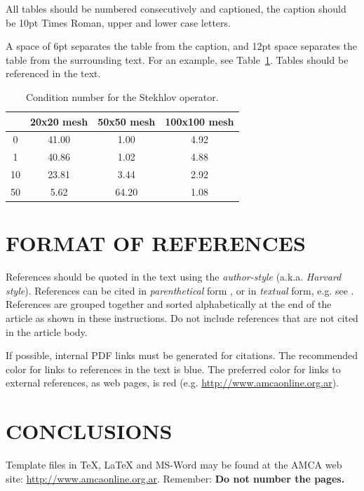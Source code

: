 \documentclass[oneside,a4paper,english,links]{amca}
\begin{document}
All tables should be numbered consecutively and captioned, the caption
should be 10pt Times Roman, upper and lower case letters.

A space of 6pt separates the table from the caption, and 12pt space
separates the table from the surrounding text. For an example, see
Table~\ref{tab:n50}. Tables should be referenced in the text.

\begin{table}[htb]
\centering
\begin{tabular}{|c|c|c|c|}
\hline  & 20x20 mesh & 50x50 mesh & 100x100 mesh\\
\hline
\hline
 0 & 41.00 & 1.00 & 4.92\\
\hline
 1 & 40.86 & 1.02 & 4.88 \\
\hline
10 & 23.81 & 3.44 & 2.92 \\
\hline
50 & 5.62 & 64.20 & 1.08 \\
\hline
\end{tabular}
\caption{Condition number for the Stekhlov operator. }
\label{tab:n50}
\end{table}

\section{FORMAT OF REFERENCES}

References should be quoted in the text using the \emph{author-style}
(a.k.a. \emph{Harvard style}). References can be cited in
\emph{parenthetical} form \citep{zienkiewicz91,idelsohn94,meyer82,meyer82b}, or
in \emph{textual} form, e.g. see
\citet{zienkiewicz91,idelsohn94,meyer82,meyer82b}.  References are grouped
together and sorted alphabetically at the end of the article as shown
in these instructions. Do not include references that are not cited in
the article body. 

If possible, internal PDF links must be generated for citations. The
recommended color for links to references in the text is blue. The
preferred color for links to external references, as web pages, 
is red (e.g. \url{http://www.amcaonline.org.ar}).

\section{CONCLUSIONS}

Template files in TeX, \LaTeX{} and MS-Word may be found at the
AMCA web site: \url{http://www.amcaonline.org.ar}. 
Remember: {\bf Do not number the pages.}
%

\end{document}
